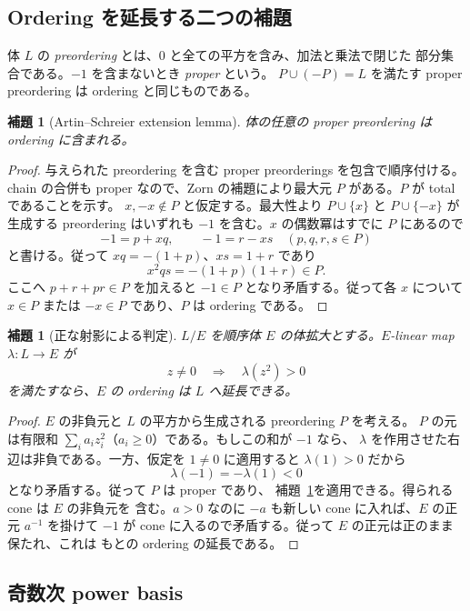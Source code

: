 \documentclass[uplatex,dvipdfmx]{jsarticle}
\newtheorem{lemma}[theorem]{補題}
\theoremstyle{definition}
\theoremstyle{remark}
\begin{document}
\subsection{Ordering を延長する二つの補題}

体 $L$ の \emph{preordering} とは、$0$ と全ての平方を含み、加法と乗法で閉じた
部分集合である。$-1$ を含まないとき \emph{proper} という。
$P\cup(-P)=L$ を満たす proper preordering は ordering と同じものである。

\begin{lemma}[Artin--Schreier extension lemma]\label{lem:preorder-extension-ja}
体の任意の proper preordering は ordering に含まれる。
\end{lemma}
\begin{proof}
与えられた preordering を含む proper preorderings を包含で順序付ける。chain の合併も
proper なので、Zorn の補題により最大元 $P$ がある。$P$ が total であることを示す。
$x,-x\notin P$ と仮定する。最大性より $P\cup\{x\}$ と $P\cup\{-x\}$ が生成する
preordering はいずれも $-1$ を含む。$x$ の偶数冪はすでに $P$ にあるので
\[
  -1=p+xq,\qquad -1=r-xs
  \quad(p,q,r,s\in P)
\]
と書ける。従って $xq=-(1+p)$、$xs=1+r$ であり
\[
  x^2qs=-(1+p)(1+r)\in P.
\]
ここへ $p+r+pr\in P$ を加えると $-1\in P$ となり矛盾する。従って各 $x$ について
$x\in P$ または $-x\in P$ であり、$P$ は ordering である。
\end{proof}

\begin{lemma}[正な射影による判定]\label{lem:projection-ja}
$L/E$ を順序体 $E$ の体拡大とする。$E$-linear map $\lambda:L\to E$ が
\[
  z\ne0\quad\Longrightarrow\quad\lambda(z^2)>0
\]
を満たすなら、$E$ の ordering は $L$ へ延長できる。
\end{lemma}
\begin{proof}
$E$ の非負元と $L$ の平方から生成される preordering $P$ を考える。
$P$ の元は有限和 $\sum_i a_i z_i^2$（$a_i\ge0$）である。もしこの和が $-1$ なら、
$\lambda$ を作用させた右辺は非負である。一方、仮定を $1\ne0$ に適用すると
$\lambda(1)>0$ だから
\[
  \lambda(-1)=-\lambda(1)<0
\]
となり矛盾する。従って $P$ は proper であり、
補題~\ref{lem:preorder-extension-ja}を適用できる。得られる cone は $E$ の非負元を
含む。$a>0$ なのに $-a$ も新しい cone に入れば、$E$ の正元 $a^{-1}$ を掛けて
$-1$ が cone に入るので矛盾する。従って $E$ の正元は正のまま保たれ、これは
もとの ordering の延長である。
\end{proof}

\subsection{奇数次 power basis}
\end{document}
